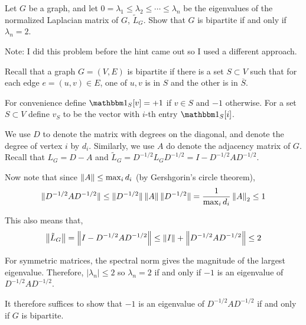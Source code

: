 \documentclass[10pt]{article}
\begin{document}
\maketitle

\begin{problem}[Problem 1]
Let \( G \) be a graph, and let \( 0  =\lambda_1 \leq \lambda_2 \leq \cdots \leq \lambda_n \) be the eigenvalues of the normalized Laplacian matrix of \( G \), \( \tilde{L}_G \). Show that \( G \) is bipartite if and only if \( \lambda_n = 2 \).
\end{problem}


\begin{solution}[Solution]
    Note: I did this problem before the hint came out so I used a different approach.

    Recall that a graph \( G = (V,E) \) is bipartite if there is a set \( S\subset V \) such that for each edge \( e=(u,v) \in E \), one of \( u,v \) is in \( S \) and the other is in \( \overline{S} \).

    For convenience define \( \bOne_S[v] = +1 \) if \( v\in S \) and \( -1 \) otherwise. For a set \( S\subset V \) define \( v_S \) to be the vector with \( i \)-th entry \( \bOne_S[i] \).

    We use \( D \) to denote the matrix with degrees on the diagonal, and denote the degree of vertex \( i \) by \( d_i \). Similarly, we use \( A \) do denote the adjacency matrix of \( G \). Recall that \( L_G = D-A \) and \( \tilde{L}_G = D^{-1/2} L_G D^{-1/2}  = I - D^{-1/2}AD^{-1/2} \). 

    Now note that since \( \left\lVert A\right\rVert \leq \max_i d_i \) (by Gershgorin's circle theorem),
    \begin{align*}
        \lVert D^{-1/2}AD^{-1/2}\rVert \leq \lVert D^{-1/2}\rVert\left\lVert A\right\rVert\lVert D^{-1/2}\rVert = \frac{1}{\max_i d_i} \left\lVert A\right\rVert_2 \leq 1 
    \end{align*}

    This also means that,
    \begin{align*}
        \left\lVert\tilde{L}_G\right\rVert 
        = \left\lVert I - D^{-1/2} A D^{-1/2}\right\rVert 
        \leq \left\lVert I\right\rVert + \left\lVert D^{-1/2}AD^{-1/2}\right\rVert
        \leq 2
    \end{align*}

    For symmetric matrices, the spectral norm gives the magnitude of the largest eigenvalue. Therefore, \( |\lambda_n| \leq 2 \) so \( \lambda_n = 2 \) if and only if \( -1 \) is an eigenvalue of \( D^{-1/2}AD^{-1/2} \). 
    
    It therefore suffices to show that \( -1 \) is an eigenvalue of \( D^{-1/2}AD^{-1/2} \) if and only if \( G \) is bipartite.
   

\end{solution}
\end{document}
